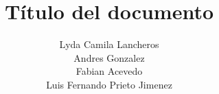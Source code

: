 \documentclass[stu, 12pt, letterpaper, donotrepeattitle, floatsintext, natbib]{apa7}
\title{\Large Título del documento}
\author{Lyda Camila Lancheros \\Andres Gonzalez \\Fabian Acevedo \\Luis Fernando Prieto Jimenez} %
\affiliation{Universidad Piloto de Colombia}
\begin{document}
\maketitle


\renewcommand\contentsname{\largeÍndice}
\tableofcontents
\setcounter{tocdepth}{2}
\newpage
\renewcommand{\listfigurename}{\largeÍndice de fíguras}
\listoffigures
\newpage
\renewcommand{\listtablename}{\largeÍndice de tablas}
\listoftables
\newpage






\newpage
\renewcommand\refname{\large\textbf{Referencias}}

\end{document}
